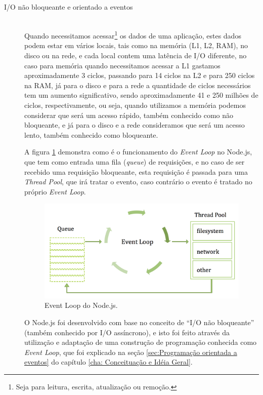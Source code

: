 \begin{description}
\item[I/O não bloqueante e orientado a eventos] \hfill \\
Quando necessitamos acessar\footnote{Seja para leitura, escrita, atualização ou remoção.} os dados de uma aplicação, estes dados podem estar em vários locais, tais como na memória (L1, L2, RAM), no disco ou na rede, e cada local contem uma latência de I/O diferente, no caso para memória quando necessitamos acessar a L1 gastamos aproximadamente  3 ciclos, passando para 14 ciclos na L2 e para 250 ciclos na RAM, já para o disco e para a rede a quantidade de ciclos necessários tem um aumento significativo, sendo aproximadamente 41 e 250 milhões de ciclos, respectivamente, ou seja, quando utilizamos a memória podemos considerar que será um acesso rápido, também conhecido como não bloqueante, e já para o disco e a rede consideramos que será um acesso lento, também conhecido como bloqueante.

A figura \ref{fig:Event Loop do Node.js} \cite{nodeMeet} demonstra como é o funcionamento do \textit{Event Loop} no Node.js, que tem como entrada uma fila (\textit{queue}) de requisições, e no caso de ser recebido uma requisição bloqueante, esta requisição é passada para uma \textit{Thread Pool}, que irá tratar o evento, caso contrário o evento é tratado no próprio \textit{Event Loop}.

\begin{figure}[ht]
\centering
\includegraphics[scale=0.3]{images/node_event_loop.png}
\caption{Event Loop do Node.js.}
\label{fig:Event Loop do Node.js}
\end{figure}

O Node.js foi desenvolvido com base no conceito de ``I/O não bloqueante''\nocite{nodeRight}  (também conhecido por I/O assíncrono), e isto foi feito através da utilização e adaptação de uma construção  de programação conhecida como \textit{Event Loop}, que foi explicado na seção \ref{sec:Programação orientada a eventos} do capítulo \ref{cha: Conceituação e Idéia Geral}.


\end{description}
